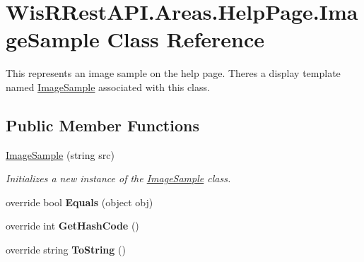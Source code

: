 \hypertarget{class_wis_r_rest_a_p_i_1_1_areas_1_1_help_page_1_1_image_sample}{}\section{Wis\+R\+Rest\+A\+P\+I.\+Areas.\+Help\+Page.\+Image\+Sample Class Reference}
\label{class_wis_r_rest_a_p_i_1_1_areas_1_1_help_page_1_1_image_sample}


This represents an image sample on the help page. There\textquotesingle{}s a display template named \hyperlink{class_wis_r_rest_a_p_i_1_1_areas_1_1_help_page_1_1_image_sample}{Image\+Sample} associated with this class.  


\subsection*{Public Member Functions}
\begin{DoxyCompactItemize}
\item 
\hyperlink{class_wis_r_rest_a_p_i_1_1_areas_1_1_help_page_1_1_image_sample_a24eec38e894202dd187938bdb6d21ff5}{Image\+Sample} (string src)
\begin{DoxyCompactList}\small\item\em Initializes a new instance of the \hyperlink{class_wis_r_rest_a_p_i_1_1_areas_1_1_help_page_1_1_image_sample}{Image\+Sample} class. \end{DoxyCompactList}\item 
\hypertarget{class_wis_r_rest_a_p_i_1_1_areas_1_1_help_page_1_1_image_sample_aa4c6d100cc7eec623341be3d87b6e405}{}override bool {\bfseries Equals} (object obj)\label{class_wis_r_rest_a_p_i_1_1_areas_1_1_help_page_1_1_image_sample_aa4c6d100cc7eec623341be3d87b6e405}

\item 
\hypertarget{class_wis_r_rest_a_p_i_1_1_areas_1_1_help_page_1_1_image_sample_ac6a41df94f7c5299293ffbe5b97186a9}{}override int {\bfseries Get\+Hash\+Code} ()\label{class_wis_r_rest_a_p_i_1_1_areas_1_1_help_page_1_1_image_sample_ac6a41df94f7c5299293ffbe5b97186a9}

\item 
\hypertarget{class_wis_r_rest_a_p_i_1_1_areas_1_1_help_page_1_1_image_sample_af0ec643c0ddd7949e55f7173a476dfb8}{}override string {\bfseries To\+String} ()\label{class_wis_r_rest_a_p_i_1_1_areas_1_1_help_page_1_1_image_sample_af0ec643c0ddd7949e55f7173a476dfb8}

\end{DoxyCompactItemize}
